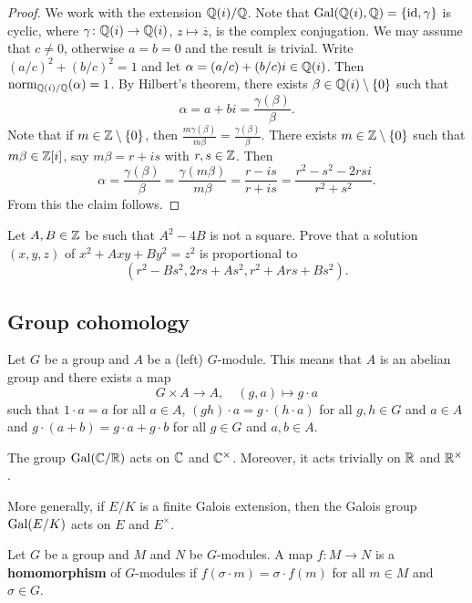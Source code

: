 \begin{proof}
    We work with the extension $\mathbb{Q}(i)/\mathbb{Q}$. Note that 
    $\operatorname{Gal}(\mathbb{Q}(i),\mathbb{Q})=\{\operatorname{id},\gamma\}$ is cyclic, where 
    $\gamma\colon\mathbb{Q}(i)\to\mathbb{Q}(i)$, $z\mapsto\overline{z}$, is the complex conjugation. 
    We may assume that $c\ne 0$, otherwise $a=b=0$ and the result is trivial.  
    Write $(a/c)^2+(b/c)^2=1$ and let $\alpha=(a/c)+(b/c)i\in\mathbb{Q}(i)$. Then
    $\operatorname{norm}_{\mathbb{Q}(i)/\mathbb{Q}}(\alpha)=1$. 
    By Hilbert's theorem, 
    there exists $\beta\in\mathbb{Q}(i)\setminus\{0\}$ such that 
    \[
    \alpha=a+bi=\frac{\gamma(\beta)}{\beta}.
    \]
    Note that if $m\in\mathbb{Z}\setminus\{0\}$, then 
    $\frac{m\gamma(\beta)}{m\beta}=\frac{\gamma(\beta)}{\beta}$. 
    There exists $m\in\mathbb{Z}\setminus\{0\}$ such that 
    $m\beta\in\mathbb{Z}[i]$, say $m\beta=r+is$ with $r,s\in\mathbb{Z}$. Then
    \[
    \alpha=\frac{\gamma(\beta)}{\beta}=\frac{\gamma(m\beta)}{m\beta}=
    \frac{r-is}{r+is}=\frac{r^2-s^2-2rsi}{r^2+s^2}.
    \]
    From this the claim follows. 
\end{proof}

\begin{exercise}
Let $A,B\in\mathbb{Z}$ be such that $A^2-4B$ is not a square. Prove that 
a solution $(x,y,z)$ of $x^2 + Axy + By^2 = z^2$
is proportional to 
\[
(r^2-Bs^2,2rs+As^2,r^2+Ars+Bs^2).
\]
\end{exercise}

\subsection{Group cohomology}

Let $G$ be a group and $A$ be a (left) $G$-module. This means that $A$ is an abelian
group and there exists a map
\[
G\times A\to A,\quad
(g,a)\mapsto g\cdot a
\]
such that $1\cdot a=a$ for all $a\in A$, $(gh)\cdot a=g\cdot (h\cdot a)$ for 
all $g,h\in G$ and $a\in A$ and $g\cdot (a+b)=g\cdot a+g\cdot b$ for
all $g\in G$ and $a,b\in A$. 

\begin{example}
    The group $\operatorname{Gal}(\mathbb{C}/\mathbb{R})$ acts on $\mathbb{C}$ and $\mathbb{C}^\times$. Moreover, 
    it acts trivially on $\mathbb{R}$ and $\mathbb{R}^\times$. 
\end{example}

More generally, if $E/K$ is a finite Galois extension, then 
the Galois group $\operatorname{Gal}(E/K)$ acts on $E$ and $E^\times$. 

\begin{definition}
    Let $G$ be a group and $M$ and $N$ be $G$-modules. A map 
    $f\colon M\to N$ is a \textbf{homomorphism} of $G$-modules
    if $f(\sigma\cdot m)=\sigma\cdot f(m)$ for all $m\in M$ and $\sigma\in G$.
\end{definition}

